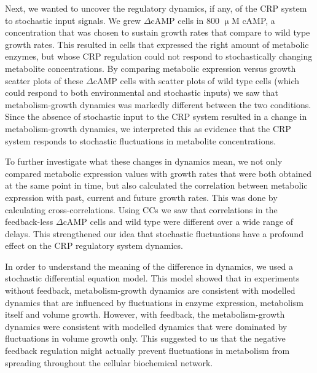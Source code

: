 Next, we wanted to 
uncover
the regulatory dynamics, if any, of the CRP system to stochastic input signals.
%
We grew  $\Delta$cAMP cells in 800 $\upmu$M cAMP,
a concentration that was chosen to sustain growth rates that compare to wild type growth rates.
%
This resulted in cells that expressed the right amount of metabolic enzymes, 
but whose CRP regulation could not respond to stochastically changing metabolite concentrations.
%
By comparing metabolic expression versus growth scatter plots of these $\Delta$cAMP cells with
scatter plots of wild type cells (which could respond to both environmental and stochastic inputs)  
we saw that metabolism-growth dynamics was markedly different between the two conditions.
%
Since the absence 
of stochastic input to the CRP system resulted in a change in metabolism-growth dynamics, 
we interpreted this as evidence that the CRP system responds to stochastic fluctuations in metabolite concentrations.

To further investigate what these changes in dynamics mean, 
we not only compared metabolic expression values with growth rates that were both obtained at the same point in time,
but also calculated the correlation between metabolic expression with past, current and future growth rates.
%
This was done by calculating cross-correlations.
%
Using CCs we saw that correlations in the feedback-less $\Delta$cAMP cells and wild type were different over a wide range of delays.
%
This strengthened our idea that stochastic fluctuations have a profound effect on the CRP regulatory system dynamics.

In order to understand the meaning of the difference in dynamics, we used a stochastic differential equation model.
%
This model showed that in experiments without feedback, metabolism-growth dynamics are consistent with modelled dynamics that are influenced by fluctuations in enzyme expression, metabolism itself and volume growth.
% 
However, with feedback, the metabolism-growth dynamics were consistent with modelled dynamics that were dominated by fluctuations in volume growth only.
%
This suggested to us that the negative feedback regulation might actually 
prevent fluctuations in metabolism from spreading throughout the cellular biochemical network.



